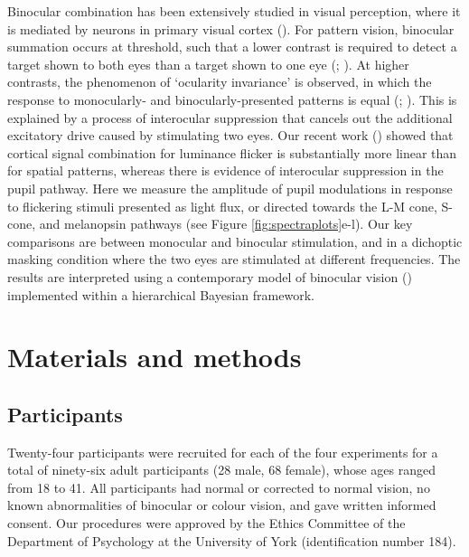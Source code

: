 \documentclass[
]{article}
\begin{document}
Binocular combination has been extensively studied in visual perception, where it is mediated by neurons in primary visual cortex (). For pattern vision, binocular summation occurs at threshold, such that a lower contrast is required to detect a target shown to both eyes than a target shown to one eye (; ). At higher contrasts, the phenomenon of `ocularity invariance' is observed, in which the response to monocularly- and binocularly-presented patterns is equal (; ). This is explained by a process of interocular suppression that cancels out the additional excitatory drive caused by stimulating two eyes. Our recent work () showed that cortical signal combination for luminance flicker is substantially more linear than for spatial patterns, whereas there is evidence of interocular suppression in the pupil pathway. Here we measure the amplitude of pupil modulations in response to flickering stimuli presented as light flux, or directed towards the L-M cone, S-cone, and melanopsin pathways (see Figure \ref{fig:spectraplots}e-l). Our key comparisons are between monocular and binocular stimulation, and in a dichoptic masking condition where the two eyes are stimulated at different frequencies. The results are interpreted using a contemporary model of binocular vision () implemented within a hierarchical Bayesian framework.

\section{Materials and methods}\label{materials-and-methods}

\subsection{Participants}\label{participants}

Twenty-four participants were recruited for each of the four experiments for a total of ninety-six adult participants (28 male, 68 female), whose ages ranged from 18 to 41. All participants had normal or corrected to normal vision, no known abnormalities of binocular or colour vision, and gave written informed consent. Our procedures were approved by the Ethics Committee of the Department of Psychology at the University of York (identification number 184).
\end{document}
